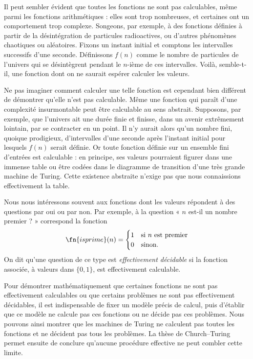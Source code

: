 \documentclass[../../../include/open-logic-section]{subfiles}
\begin{document}

Il peut sembler évident que toutes les fonctions ne sont pas
calculables, même parmi les fonctions arithmétiques : elles
sont trop nombreuses, et certaines ont un comportement trop
complexe. Songeons, par exemple, à des fonctions définies
à partir de la désintégration de particules radioactives,
ou d'autres phénomènes chaotiques ou aléatoires. Fixons un
instant initial et comptons les intervalles successifs d'une
seconde. Définissons $f(n)$ comme le nombre de particules
de l'univers qui se désintègrent pendant le $n$-ième de
ces intervalles. Voilà, semble-t-il, une fonction dont
on ne saurait espérer calculer les valeurs.

Ne pas imaginer comment calculer une telle fonction est
cependant bien différent de démontrer qu'elle n'est pas
calculable. Même une fonction qui paraît d'une complexité
insurmontable peut être calculable au sens abstrait.
Supposons, par exemple, que l'univers ait une durée finie
et finisse, dans un avenir extrêmement lointain, par se
contracter en un point. Il n'y aurait alors qu'un nombre
fini, quoique prodigieux, d'intervalles d'une seconde après
l'instant initial pour lesquels $f(n)$ serait définie.
Or toute fonction définie sur un ensemble fini d'entrées
est calculable : en principe, ses valeurs pourraient figurer
dans une immense table ou être codées dans le diagramme
de transition d'une très grande machine de Turing.
Cette existence abstraite n'exige pas que nous connaissions
effectivement la table.

Nous nous intéressons souvent aux fonctions dont les
valeurs répondent à des questions par oui ou par non.
Par exemple, à la question « $n$ est-il un nombre premier ? »
correspond la fonction
\[
\fn{isprime}(n) = \begin{cases}
  1 & \text{si $n$ est premier}\\
  0 & \text{sinon.}
  \end{cases}
\]
On dit qu'une question de ce type est
\emph{effectivement décidable} si la fonction associée,
à valeurs dans $\{0,1\}$, est effectivement calculable.

Pour démontrer mathématiquement que certaines fonctions
ne sont pas effectivement calculables ou que certains
problèmes ne sont pas effectivement décidables, il est
indispensable de fixer un modèle précis de calcul, puis
d'établir que ce modèle ne calcule pas ces fonctions ou
ne décide pas ces problèmes. Nous pouvons ainsi montrer
que les machines de Turing ne calculent pas toutes les
fonctions et ne décident pas tous les problèmes. La thèse
de Church--Turing permet ensuite de conclure qu'aucune
procédure effective ne peut combler cette limite.
\end{document}
